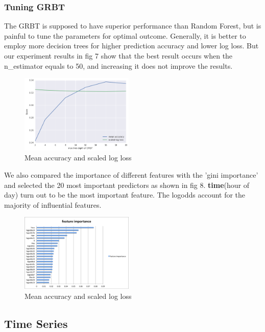 \documentclass[11pt,conference]{IEEEtran}
\begin{document}
\subsubsection{Tuning GRBT}
The GRBT is supposed to have superior performance than Random Forest, but is painful to tune the parameters for optimal outcome. Generally, it is better to employ more decision trees for higher prediction accuracy and lower log loss. But our experiment results in fig 7 show that the best result occurs when the n\_estimator equals to 50, and increasing it does not improve the results.
\begin{figure}[h]
\begin{center}
\includegraphics [width=0.48\textwidth]{pics/grbt_p1.png}
\caption{Mean accuracy and scaled log loss}
\end{center}
\end{figure}
We also compared the importance of different features with the 'gini importance' and selected the 20 most important predictors as shown in fig 8. \textbf{time}(hour of day) turn out to be the most important feature. The logodds account for the majority of influential features.
\begin{figure}[h]
\begin{center}
\includegraphics [width=0.48\textwidth]{pics/grbt_p2.png}
\caption{Mean accuracy and scaled log loss}
\end{center}
\end{figure}

\subsection{Time Series}
\end{document}
